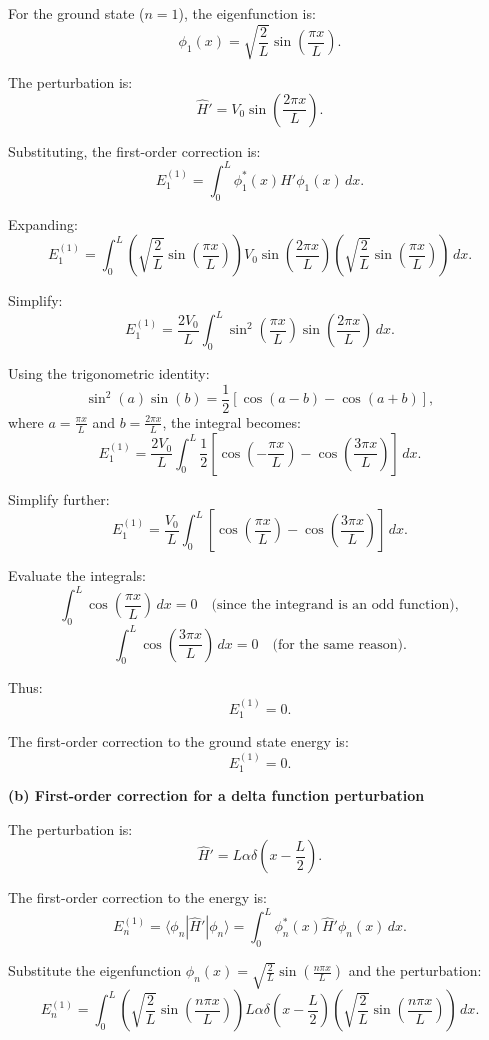 \documentclass{article}
\begin{document}
For the ground state (\(n = 1\)), the eigenfunction is:
\[
\phi_1(x) = \sqrt{\frac{2}{L}} \sin\left(\frac{\pi x}{L}\right).
\]

The perturbation is:
\[
\hat{H}' = V_0 \sin\left(\frac{2\pi x}{L}\right).
\]

Substituting, the first-order correction is:
\[
E_1^{(1)} = \int_0^L \phi_1^*(x) \hat{H}' \phi_1(x) \, dx.
\]

Expanding:
\[
E_1^{(1)} = \int_0^L \left(\sqrt{\frac{2}{L}} \sin\left(\frac{\pi x}{L}\right)\right) V_0 \sin\left(\frac{2\pi x}{L}\right) \left(\sqrt{\frac{2}{L}} \sin\left(\frac{\pi x}{L}\right)\right) \, dx.
\]

Simplify:
\[
E_1^{(1)} = \frac{2 V_0}{L} \int_0^L \sin^2\left(\frac{\pi x}{L}\right) \sin\left(\frac{2\pi x}{L}\right) \, dx.
\]

Using the trigonometric identity:
\[
\sin^2(a) \sin(b) = \frac{1}{2} \left[\cos(a-b) - \cos(a+b)\right],
\]
where \(a = \frac{\pi x}{L}\) and \(b = \frac{2\pi x}{L}\), the integral becomes:
\[
E_1^{(1)} = \frac{2 V_0}{L} \int_0^L \frac{1}{2} \left[\cos\left(-\frac{\pi x}{L}\right) - \cos\left(\frac{3\pi x}{L}\right)\right] \, dx.
\]

Simplify further:
\[
E_1^{(1)} = \frac{V_0}{L} \int_0^L \left[\cos\left(\frac{\pi x}{L}\right) - \cos\left(\frac{3\pi x}{L}\right)\right] \, dx.
\]

Evaluate the integrals:
\[
\int_0^L \cos\left(\frac{\pi x}{L}\right) \, dx = 0 \quad \text{(since the integrand is an odd function)},
\]
\[
\int_0^L \cos\left(\frac{3\pi x}{L}\right) \, dx = 0 \quad \text{(for the same reason)}.
\]

Thus:
\[
E_1^{(1)} = 0.
\]

The first-order correction to the ground state energy is:
\[
E_1^{(1)} = 0.
\]

\textbf{(b) First-order correction for a delta function perturbation}

The perturbation is:
\[
\hat{H}' = L \alpha \delta\left(x - \frac{L}{2}\right).
\]

The first-order correction to the energy is:
\[
E_n^{(1)} = \langle \phi_n | \hat{H}' | \phi_n \rangle = \int_0^L \phi_n^*(x) \hat{H}' \phi_n(x) \, dx.
\]

Substitute the eigenfunction \(\phi_n(x) = \sqrt{\frac{2}{L}} \sin\left(\frac{n \pi x}{L}\right)\) and the perturbation:
\[
E_n^{(1)} = \int_0^L \left(\sqrt{\frac{2}{L}} \sin\left(\frac{n \pi x}{L}\right)\right) L \alpha \delta\left(x - \frac{L}{2}\right) \left(\sqrt{\frac{2}{L}} \sin\left(\frac{n \pi x}{L}\right)\right) \, dx.
\]
\end{document}
